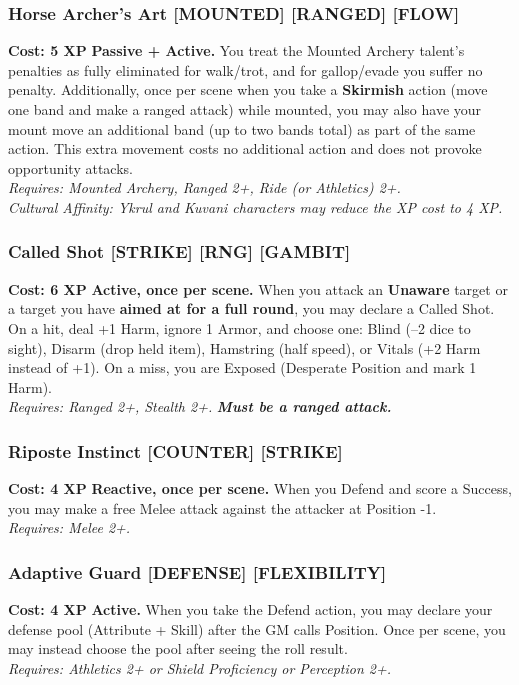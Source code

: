 \documentclass[12pt,a4paper]{book}
\begin{document}
\subsubsection*{Horse Archer's Art \textnormal{[MOUNTED] [RANGED] [FLOW]}}
\label{talent:horse-archers-art}
\textbf{Cost: 5 XP} \textbf{Passive + Active.} You treat the Mounted Archery talent's penalties as fully eliminated for walk/trot, and for gallop/evade you suffer no penalty. Additionally, once per scene when you take a \textbf{Skirmish} action (move one band and make a ranged attack) while mounted, you may also have your mount move an additional band (up to two bands total) as part of the same action. This extra movement costs no additional action and does not provoke opportunity attacks. \\
\textit{Requires: Mounted Archery, Ranged 2+, Ride (or Athletics) 2+.} \\
\textit{Cultural Affinity: Ykrul and Kuvani characters may reduce the XP cost to 4 XP.}

\subsubsection*{Called Shot \textnormal{[STRIKE] [RNG] [GAMBIT]}}
\label{talent:called-shot}
\textbf{Cost: 6 XP} \textbf{Active, once per scene.} When you attack an \textbf{Unaware} target or a target you have \textbf{aimed at for a full round}, you may declare a Called Shot. On a hit, deal +1 Harm, ignore 1 Armor, and choose one: Blind (--2 dice to sight), Disarm (drop held item), Hamstring (half speed), or Vitals (+2 Harm instead of +1). On a miss, you are Exposed (Desperate Position and mark 1 Harm). \\
\textit{Requires: Ranged 2+, Stealth 2+.} \textbf{\textit{Must be a ranged attack.}}

\subsubsection*{Riposte Instinct \textnormal{[COUNTER] [STRIKE]}}
\label{talent:riposte-instinct}
\textbf{Cost: 4 XP} \textbf{Reactive, once per scene.} When you Defend and score a Success, you may make a free Melee attack against the attacker at Position -1. \\
\textit{Requires: Melee 2+.}

\subsubsection*{Adaptive Guard \textnormal{[DEFENSE] [FLEXIBILITY]}}
\label{talent:adaptive-guard}
\textbf{Cost: 4 XP} \textbf{Active.} When you take the Defend action, you may declare your defense pool (Attribute + Skill) after the GM calls Position. Once per scene, you may instead choose the pool after seeing the roll result. \\
\textit{Requires: Athletics 2+ or Shield Proficiency or Perception 2+.}
\end{document}
